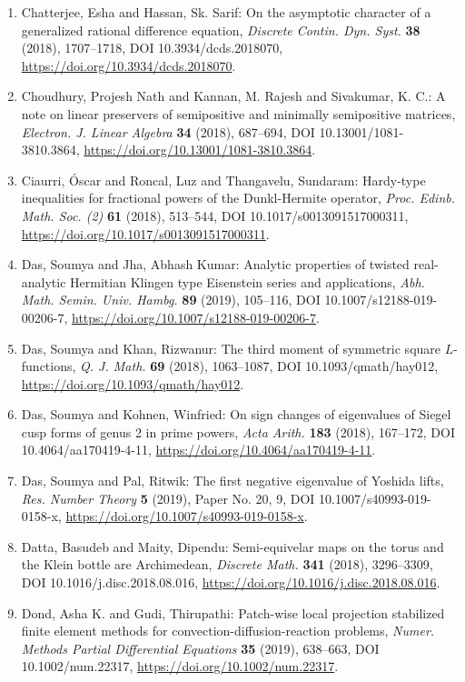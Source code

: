 \begin{enumerate}
\item Chatterjee, Esha and Hassan, Sk. Sarif: On the asymptotic character of a generalized rational
difference equation, \emph{Discrete Contin. Dyn. Syst.} {\bf 38} (2018), 1707--1718, DOI 10.3934/dcds.2018070, \url{https://doi.org/10.3934/dcds.2018070}.
\item Choudhury, Projesh Nath and Kannan, M. Rajesh and Sivakumar,
K. C.: A note on linear preservers of semipositive and minimally
semipositive matrices, \emph{Electron. J. Linear Algebra} {\bf 34} (2018), 687--694, DOI 10.13001/1081-3810.3864, \url{https://doi.org/10.13001/1081-3810.3864}.
\item Ciaurri, \'{O}scar and Roncal, Luz and Thangavelu, Sundaram: Hardy-type inequalities for fractional powers of the
{D}unkl-{H}ermite operator, \emph{Proc. Edinb. Math. Soc. (2)} {\bf 61} (2018), 513--544, DOI 10.1017/s0013091517000311, \url{https://doi.org/10.1017/s0013091517000311}.
\item Das, Soumya and Jha, Abhash Kumar: Analytic properties of twisted real-analytic {H}ermitian
{K}lingen type {E}isenstein series and applications, \emph{Abh. Math. Semin. Univ. Hambg.} {\bf 89} (2019), 105--116, DOI 10.1007/s12188-019-00206-7, \url{https://doi.org/10.1007/s12188-019-00206-7}.
\item Das, Soumya and Khan, Rizwanur: The third moment of symmetric square {$L$}-functions, \emph{Q. J. Math.} {\bf 69} (2018), 1063--1087, DOI 10.1093/qmath/hay012, \url{https://doi.org/10.1093/qmath/hay012}.
\item Das, Soumya and Kohnen, Winfried: On sign changes of eigenvalues of {S}iegel cusp forms of genus
2 in prime powers, \emph{Acta Arith.} {\bf 183} (2018), 167--172, DOI 10.4064/aa170419-4-11, \url{https://doi.org/10.4064/aa170419-4-11}.
\item Das, Soumya and Pal, Ritwik: The first negative eigenvalue of {Y}oshida lifts, \emph{Res. Number Theory} {\bf 5} (2019), Paper No. 20, 9, DOI 10.1007/s40993-019-0158-x, \url{https://doi.org/10.1007/s40993-019-0158-x}.
\item Datta, Basudeb and Maity, Dipendu: Semi-equivelar maps on the torus and the {K}lein bottle are
{A}rchimedean, \emph{Discrete Math.} {\bf 341} (2018), 3296--3309, DOI 10.1016/j.disc.2018.08.016, \url{https://doi.org/10.1016/j.disc.2018.08.016}.
\item Dond, Asha K. and Gudi, Thirupathi: Patch-wise local projection stabilized finite element methods
for convection-diffusion-reaction problems, \emph{Numer. Methods Partial Differential Equations} {\bf 35} (2019), 638--663, DOI 10.1002/num.22317, \url{https://doi.org/10.1002/num.22317}.

\end{enumerate}
